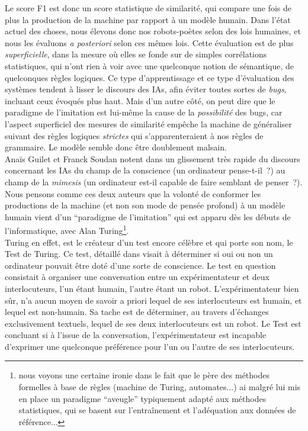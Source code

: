 \documentclass{article}
\begin{document}
					Le score F1 est donc un score statistique de similarité, qui compare une fois de plus la production de la machine par rapport à un modèle humain. Dans l'état actuel des choses, nous élevons donc nos robots-poètes selon des lois humaines, et nous les évaluons \textit{a posteriori} selon ces mêmes lois. Cette évaluation est de plus \textit{superficielle}, dans la mesure où elles se fonde sur de simples corrélations statistiques, qui n'ont rien à voir avec une quelconque notion de sémantique, de quelconques règles logiques. Ce type d'apprentissage et ce type d'évaluation des systèmes tendent à lisser le discours des IAs, afin éviter toutes sortes de \textit{bugs}, incluant ceux évoqués plus haut. Mais d'un autre côté, on peut dire que le paradigme de l'imitation est lui-même la cause de la \textit{possibilité} des bugs, car l'aspect superficiel des mesures de similarité empêche la machine de généraliser suivant des règles logiques \textit{strictes} qui s'apparenteraient à nos règles de grammaire. Le modèle semble donc être doublement malsain.\\
					
					Anaïs Guilet et Franck Soudan notent dans \cite{guilet2017} un glissement très rapide du discours concernant les IAs du champ de la conscience (un ordinateur pense-t-il~?) au champ de la \textit{mimesis} (un ordinateur est-il capable de faire semblant de penser~?). Nous pensons comme ces deux auteurs que la volonté de conformer les productions de la machine (et non son mode de pensée profond) à un modèle humain vient d'un ``paradigme de l'imitation'' qui est apparu dès les débuts de l'informatique, avec Alan Turing\footnote{nous voyons une certaine ironie dans le fait que le père des méthodes formelles à base de règles (machine de Turing, automates...) ai malgré lui mis en place un paradigme ``aveugle'' typiquement adapté aux méthodes statistiques, qui se basent sur l'entraînement et l'adéquation aux données de référence...}. \\
					
					Turing en effet, est le créateur d'un test encore célèbre et qui porte son nom, le Test de Turing. Ce test, détaillé dans \cite{turing1950} visait à déterminer si oui ou non un ordinateur pouvait être doté d'une sorte de conscience. Le test en question consistait à organiser une conversation entre un expérimentateur et deux interlocuteurs, l'un étant humain, l'autre étant un robot. L'expérimentateur bien sûr, n'a aucun moyen de savoir a priori lequel de ses interlocuteurs est humain, et lequel est non-humain. Sa tache est de déterminer, au travers d'échanges exclusivement textuels, lequel de ses deux interlocuteurs est un robot. Le Test est concluant si à l'issue de la conversation, l'expérimentateur est incapable d'exprimer une quelconque préférence pour l'un ou l'autre de ses interlocuteurs.\\
					
\end{document}
